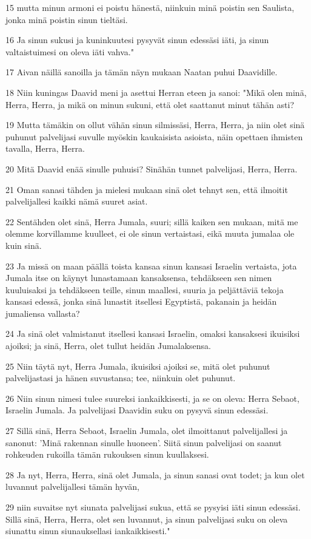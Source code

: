 \par 15 mutta minun armoni ei poistu hänestä, niinkuin minä poistin sen Saulista, jonka minä poistin sinun tieltäsi.
\par 16 Ja sinun sukusi ja kuninkuutesi pysyvät sinun edessäsi iäti, ja sinun valtaistuimesi on oleva iäti vahva."
\par 17 Aivan näillä sanoilla ja tämän näyn mukaan Naatan puhui Daavidille.
\par 18 Niin kuningas Daavid meni ja asettui Herran eteen ja sanoi: "Mikä olen minä, Herra, Herra, ja mikä on minun sukuni, että olet saattanut minut tähän asti?
\par 19 Mutta tämäkin on ollut vähän sinun silmissäsi, Herra, Herra, ja niin olet sinä puhunut palvelijasi suvulle myöskin kaukaisista asioista, näin opettaen ihmisten tavalla, Herra, Herra.
\par 20 Mitä Daavid enää sinulle puhuisi? Sinähän tunnet palvelijasi, Herra, Herra.
\par 21 Oman sanasi tähden ja mielesi mukaan sinä olet tehnyt sen, että ilmoitit palvelijallesi kaikki nämä suuret asiat.
\par 22 Sentähden olet sinä, Herra Jumala, suuri; sillä kaiken sen mukaan, mitä me olemme korvillamme kuulleet, ei ole sinun vertaistasi, eikä muuta jumalaa ole kuin sinä.
\par 23 Ja missä on maan päällä toista kansaa sinun kansasi Israelin vertaista, jota Jumala itse on käynyt lunastamaan kansaksensa, tehdäkseen sen nimen kuuluisaksi ja tehdäkseen teille, sinun maallesi, suuria ja peljättäviä tekoja kansasi edessä, jonka sinä lunastit itsellesi Egyptistä, pakanain ja heidän jumaliensa vallasta?
\par 24 Ja sinä olet valmistanut itsellesi kansasi Israelin, omaksi kansaksesi ikuisiksi ajoiksi; ja sinä, Herra, olet tullut heidän Jumalaksensa.
\par 25 Niin täytä nyt, Herra Jumala, ikuisiksi ajoiksi se, mitä olet puhunut palvelijastasi ja hänen suvustansa; tee, niinkuin olet puhunut.
\par 26 Niin sinun nimesi tulee suureksi iankaikkisesti, ja se on oleva: Herra Sebaot, Israelin Jumala. Ja palvelijasi Daavidin suku on pysyvä sinun edessäsi.
\par 27 Sillä sinä, Herra Sebaot, Israelin Jumala, olet ilmoittanut palvelijallesi ja sanonut: 'Minä rakennan sinulle huoneen'. Siitä sinun palvelijasi on saanut rohkeuden rukoilla tämän rukouksen sinun kuullaksesi.
\par 28 Ja nyt, Herra, Herra, sinä olet Jumala, ja sinun sanasi ovat todet; ja kun olet luvannut palvelijallesi tämän hyvän,
\par 29 niin suvaitse nyt siunata palvelijasi sukua, että se pysyisi iäti sinun edessäsi. Sillä sinä, Herra, Herra, olet sen luvannut, ja sinun palvelijasi suku on oleva siunattu sinun siunauksellasi iankaikkisesti."

